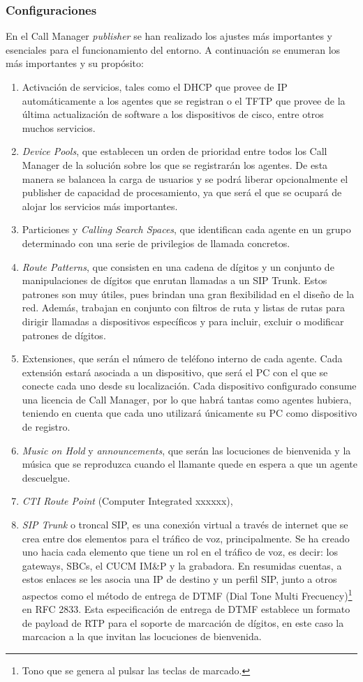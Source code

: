 \documentclass[a4paper, 12pt]{book}
\begin{document}
\subsubsection{Configuraciones}
\label{sec:conf_cucm}
En el Call Manager \emph{publisher} se han realizado los ajustes más importantes y esenciales para el funcionamiento del entorno. A continuación se enumeran los más importantes y su propósito:
\begin{enumerate}
  \item Activación de servicios, tales como el DHCP que provee de IP automáticamente a los agentes que se registran o el TFTP que provee de la última actualización de software a los dispositivos de cisco, entre otros muchos servicios.
  \item \emph{Device Pools}, que establecen un orden de prioridad entre todos los Call Manager de la solución sobre los que se registrarán los agentes. De esta manera se balancea la carga de usuarios y se podrá liberar opcionalmente el publisher de capacidad de procesamiento, ya que será el que se ocupará de alojar los servicios más importantes.
  \item Particiones y \emph{Calling Search Spaces}, que identifican cada agente en un grupo determinado con una serie de privilegios de llamada concretos.
  \item \emph{Route Patterns}, que consisten en una cadena de dígitos y un conjunto de manipulaciones de dígitos que enrutan llamadas a un SIP Trunk. Estos patrones son muy útiles, pues brindan una gran flexibilidad en el diseño de la red. Además, trabajan en conjunto con filtros de ruta y listas de rutas para dirigir llamadas a dispositivos específicos y para incluir, excluir o modificar patrones de dígitos.
  \item Extensiones, que serán el número de teléfono interno de cada agente. Cada extensión estará asociada a un dispositivo, que será el PC con el que se conecte cada uno desde su localización. Cada dispositivo configurado consume una licencia de Call Manager, por lo que habrá tantas como agentes hubiera, teniendo en cuenta que cada uno utilizará únicamente su PC como dispositivo de registro.
  \item \emph{Music on Hold} y \emph{announcements}, que serán las locuciones de bienvenida y la música que se reproduzca cuando el llamante quede en espera a que un agente descuelgue.
  \item \emph{CTI Route Point} (Computer Integrated xxxxxx), 
  \item \emph{SIP Trunk} o troncal SIP, es una conexión virtual a través de internet que se crea entre dos elementos para el tráfico de voz, principalmente. Se ha creado uno hacia cada elemento que tiene un rol en el tráfico de voz, es decir: los gateways, SBCs, el CUCM IM\&P y la grabadora. En resumidas cuentas, a estos enlaces se les asocia una IP de destino y un perfil SIP, junto a otros aspectos como el método de entrega de DTMF (Dial Tone Multi Frecuency)\footnote{Tono que se genera al pulsar las teclas de marcado.} en RFC 2833. Esta especificación de entrega de DTMF establece un formato de payload de RTP para el soporte de marcación de dígitos, en este caso la marcacion a la que invitan las locuciones de bienvenida.

\end{enumerate}
\end{document}
